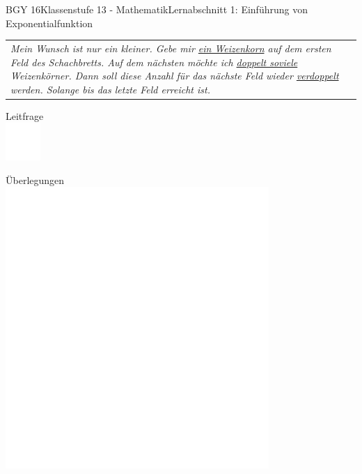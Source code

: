 \documentclass[oneside,openany,headings=optiontotoc,11pt,numbers=noenddot]{scrreprt}
\begin{document}
\begin{worksheet}{BGY 16}{Klassenstufe 13 - Mathematik}{Lernabschnitt 1: Einführung von Exponentialfunktion}
\begin{framed}
\begin{tabularx}{\textwidth}{X}
				\glqq{}\textit{Mein Wunsch ist nur ein kleiner. Gebe mir \underline{ein Weizenkorn} auf dem ersten Feld des Schachbretts. Auf dem nächsten möchte ich \underline{doppelt soviele} Weizenkörner. Dann soll diese Anzahl für das nächste Feld wieder \underline{verdoppelt} werden. Solange bis das letzte Feld erreicht ist.}\grqq{}
			\end{tabularx}
		\end{framed}
		\begin{framed}
			\color{codegray}\tiny Leitfrage\\
			\includegraphics[width=0.1\textwidth]{../../empty.jpg}
		\end{framed}
		\begin{framed}
			\tiny Überlegungen\\
			\includegraphics[width=0.75\textwidth]{../../empty.jpg}\\

\end{framed}
\end{worksheet}
\end{document}
